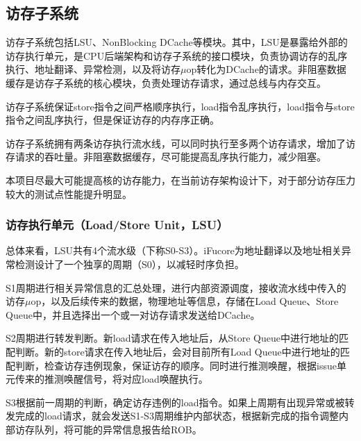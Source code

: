 \documentclass{article}
\begin{document}
\subsection{访存子系统}
访存子系统包括LSU、NonBlocking DCache等模块。其中，LSU是暴露给外部的访存执行单元，是CPU后端架构和访存子系统的接口模块，负责协调访存的乱序执行、地址翻译、异常检测，以及将访存$\mu$op转化为DCache的请求。非阻塞数据缓存是访存子系统的核心模块，负责处理访存请求，通过总线与内存交互。\par
访存子系统保证store指令之间严格顺序执行，load指令乱序执行，load指令与store指令之间乱序执行，但是保证访存的内存序正确。\par
访存子系统拥有两条访存执行流水线，可以同时执行至多两个访存请求，增加了访存请求的吞吐量。非阻塞数据缓存，尽可能提高乱序执行能力，减少阻塞。\par
本项目尽最大可能提高核的访存能力，在当前访存架构设计下，对于部分访存压力较大的测试点性能提升明显。
\subsubsection{访存执行单元（Load/Store Unit，LSU）}
总体来看，LSU共有4个流水级（下称S0-S3）。iFucore为地址翻译以及地址相关异常检测设计了一个独享的周期（S0），以减轻时序负担。\par
S1周期进行相关异常信息的汇总处理，进行内部资源调度，接收流水线中传入的访存$\mu$op，以及后续传来的数据，物理地址等信息，存储在Load Queue、Store Queue中，并且选择出一个或一对访存请求发送给DCache。\par
S2周期进行转发判断。新load请求在传入地址后，从Store Queue中进行地址的匹配判断。新的store请求在传入地址后，会对目前所有Load Queue中进行地址的匹配判断，检查访存违例现象，保证访存的顺序。同时进行推测唤醒，根据issue单元传来的推测唤醒信号，将对应load唤醒执行。\par
S3根据前一周期的判断，确定访存违例的load指令。如果上周期有出现异常或被转发完成的load请求，就会发送S1-S3周期维护内部状态，根据新完成的指令调整内部访存队列，将可能的异常信息报告给ROB。\par
\end{document}

